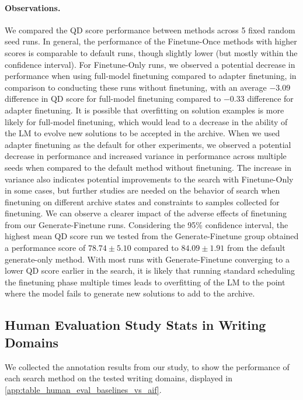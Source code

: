 \paragraph{Observations.}
We compared the QD score performance between methods across 5 fixed random seed runs. In general, the performance of the Finetune-Once methods with higher scores is comparable to default runs, though slightly lower (but mostly within the confidence interval). For Finetune-Only runs, we observed a potential decrease in performance when using full-model finetuning compared to adapter finetuning, in comparison to conducting these runs without finetuning, with an average $-3.09$ difference in QD score for full-model finetuning compared to $-0.33$ difference for adapter finetuning. It is possible that overfitting on solution examples is more likely for full-model finetuning, which would lead to a decrease in the ability of the LM to evolve new solutions to be accepted in the archive. When we used adapter finetuning as the default for other experiments, we observed a potential decrease in performance and increased variance in performance across multiple seeds when compared to the default method without finetuning. The increase in variance also indicates potential improvements to the search with Finetune-Only in some cases, but further studies are needed on the behavior of search when finetuning on different archive states and constraints to samples collected for finetuning. We can observe a clearer impact of the adverse effects of finetuning from our Generate-Finetune runs. Considering the 95\% confidence interval, the highest mean QD score run we tested from the Generate-Finetune group obtained a performance score of $78.74\pm5.10$ compared to $84.09\pm1.91$ from the default generate-only method. With most runs with Generate-Finetune converging to a lower QD score earlier in the search, it is likely that running standard scheduling the finetuning phase multiple times leads to overfitting of the LM to the point where the model fails to generate new solutions to add to the archive.

\clearpage
\newpage
\subsection{Human Evaluation Study Stats in Writing Domains}\label{app:full_human_eval_tables}
We collected the annotation results from our study, to show the performance of each search method on the tested writing domains, displayed in \cref{app:table_human_eval_baselines_vs_aif}.

